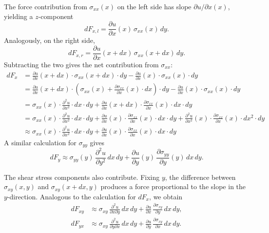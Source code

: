The force contribution from $\sigma_{xx}(x)$ on the left side has slope $\partial u / \partial x(x)$, yielding a $z$-component
\[
dF_{x,l} = \frac{\partial u}{\partial x}(x)\, \sigma_{xx}(x)\, dy.
\]
Analogously, on the right side,
\[
dF_{x,r} = \frac{\partial u}{\partial x}(x+dx)\, \sigma_{xx}(x+dx)\, dy.
\]
Subtracting the two gives the net contribution from $\sigma_{xx}$:
\begin{align*}
    dF_x&=\frac{\partial u}{\partial x}(x+dx) \cdot \sigma_{xx}(x+dx)\cdot dy-\frac{\partial u}{\partial x}(x) \cdot \sigma_{xx}(x)\cdot dy\\
    &=\frac{\partial u}{\partial x}(x+dx) \cdot \left(\sigma_{xx}(x)+\frac{\partial\sigma_{xx}}{\partial x}(x)\cdot dx\right)\cdot dy-\frac{\partial u}{\partial x}(x) \cdot \sigma_{xx}(x)\cdot dy\\
    &=\sigma_{xx}(x)\cdot \frac{\partial^2u}{\partial x^2}\cdot dx\cdot dy+\frac{\partial u}{\partial x}(x+dx) \cdot\frac{\partial\sigma_{xx}}{\partial x}(x)\cdot dx\cdot dy\\
    &=\sigma_{xx}(x)\cdot \frac{\partial^2u}{\partial x^2}\cdot dx\cdot dy+\frac{\partial u}{\partial x}(x) \cdot\frac{\partial\sigma_{xx}}{\partial x} (x)\cdot dx\cdot dy+\frac{\partial^2u}{\partial x^2}(x) \cdot\frac{\partial\sigma_{xx}}{\partial x}(x)\cdot dx^2\cdot dy\\
    &\approx\sigma_{xx}(x)\cdot \frac{\partial^2u}{\partial x^2}\cdot dx\cdot dy+\frac{\partial u}{\partial x}(x) \cdot\frac{\partial\sigma_{xx}}{\partial x}(x)\cdot dx\cdot dy
\end{align*}
A similar calculation for $\sigma_{yy}$ gives
\[
dF_y \approx \sigma_{yy}(y)\, \frac{\partial^2 u}{\partial y^2}\, dx\, dy + \frac{\partial u}{\partial y}(y)\, \frac{\partial \sigma_{yy}}{\partial y}(y)\, dx\, dy.
\]

The shear stress components also contribute. Fixing $y$, the difference between $\sigma_{xy}(x,y)$ and $\sigma_{xy}(x+dx,y)$ produces a force proportional to the slope in the $y$-direction. Analogous to the calculation for $dF_x$, we obtain
\begin{align*}
    dF_{xy} &\approx \sigma_{xy}\, \frac{\partial^2 u}{\partial x \partial y}\, dx\, dy + \frac{\partial u}{\partial x}\, \frac{\partial \sigma_{xy}}{\partial y}\, dx\, dy,\\
    dF_{yx} &\approx \sigma_{xy}\, \frac{\partial^2 u}{\partial y \partial x}\, dx\, dy + \frac{\partial u}{\partial y}\, \frac{\partial \sigma_{xy}}{\partial x}\, dx\, dy.
\end{align*}

